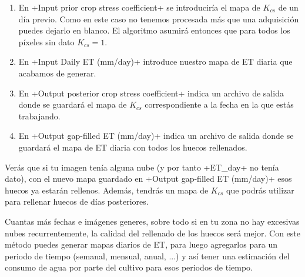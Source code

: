 \documentclass[a4paper,11pt]{article}
\begin{document}
\begin{enumerate}
   \item En \cverb+Input prior crop stress coefficient+ se introduciría el mapa de $K_{cs}$ de un día previo. Como en este caso no tenemos procesada más que una adquisición puedes dejarlo en blanco. El algoritmo asumirá entonces que para todos los píxeles sin dato $K_{cs}=1$.
   
   \item En \cverb+Input Daily ET (mm/day)+ introduce nuestro mapa de ET diaria que acabamos de generar. 
   
   \item En \cverb+Output posterior crop stress coefficient+ indica un archivo de salida donde se guardará el mapa de $K_{cs}$ correspondiente a la fecha en la que estás trabajando.
   
   \item En \cverb+Output gap-filled ET (mm/day)+ indica un archivo de salida donde se guardará el mapa de ET diaria con todos los huecos rellenados.
  \end{enumerate}

  Verás que si tu imagen tenía alguna nube (y por tanto \cverb+ET_day+ no tenía dato), con el nuevo mapa guardado en \cverb+Output gap-filled ET (mm/day)+ esos huecos ya estarán rellenos. Además, tendrás un mapa de $K_{cs}$ que podrás utilizar para rellenar huecos de días posteriores.
  
  Cuantas más fechas e imágenes generes, sobre todo si en tu zona no hay excesivas nubes recurrentemente, la calidad del rellenado de los huecos será mejor. Con este método puedes generar mapas diarios de ET, para luego agregarlos para un periodo de tiempo (semanal, mensual, anual, ...) y así tener una estimación del consumo de agua por parte del cultivo para esos periodos de tiempo.
    
\end{document}
